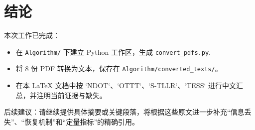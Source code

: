 \documentclass[journal,12pt,onecolumn]{IEEEtran}
\begin{document}
\section*{结论}
本次工作已完成：
\begin{itemize}
  \item 在 \texttt{Algorithm/} 下建立 Python 工作区，生成 \texttt{convert\_pdfs.py}.\\
  \item 将 8 份 PDF 转换为文本，保存在 \texttt{Algorithm/converted\_texts/}。\\
  \item 在本 LaTeX 文档中按 `NDOT`、`OTTT`、`S-TLLR`、`TESS` 进行中文汇总，并注明当前证据与缺失。\
\end{itemize}

后续建议：请继续提供具体摘要或关键段落，将根据这些原文进一步补充“信息丢失”、“恢复机制”和“定量指标”的精确引用。



\end{document}
